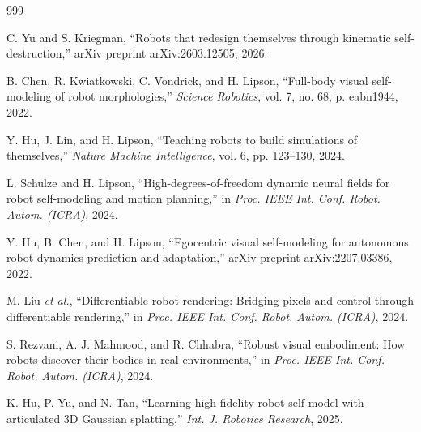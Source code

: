 \documentclass[12pt,a4paper,oneside]{report}
\begin{document}
\begin{thebibliography}{999}

C. Yu and S. Kriegman, ``Robots that redesign themselves through kinematic self-destruction,'' arXiv preprint arXiv:2603.12505, 2026.





B. Chen, R. Kwiatkowski, C. Vondrick, and H. Lipson, ``Full-body visual self-modeling of robot morphologies,'' \textit{Science Robotics}, vol. 7, no. 68, p. eabn1944, 2022.




Y. Hu, J. Lin, and H. Lipson, ``Teaching robots to build simulations of themselves,'' \textit{Nature Machine Intelligence}, vol. 6, pp. 123--130, 2024.




L. Schulze and H. Lipson, ``High-degrees-of-freedom dynamic neural fields for robot self-modeling and motion planning,'' in \textit{Proc. IEEE Int. Conf. Robot. Autom. (ICRA)}, 2024.




Y. Hu, B. Chen, and H. Lipson, ``Egocentric visual self-modeling for autonomous robot dynamics prediction and adaptation,'' arXiv preprint arXiv:2207.03386, 2022.




M. Liu \textit{et al.}, ``Differentiable robot rendering: Bridging pixels and control through differentiable rendering,'' in \textit{Proc. IEEE Int. Conf. Robot. Autom. (ICRA)}, 2024.




S. Rezvani, A. J. Mahmood, and R. Chhabra, ``Robust visual embodiment: How robots discover their bodies in real environments,'' in \textit{Proc. IEEE Int. Conf. Robot. Autom. (ICRA)}, 2024.




K. Hu, P. Yu, and N. Tan, ``Learning high-fidelity robot self-model with articulated {3D} Gaussian splatting,'' \textit{Int. J. Robotics Research}, 2025.




\end{thebibliography}
\end{document}
